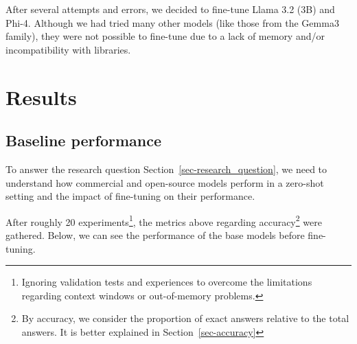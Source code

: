 \documentclass[
  12pt,
]{article}
\begin{document}
After several attempts and errors, we decided to fine-tune Llama 3.2
(3B) and Phi-4. Although we had tried many other models (like those from
the Gemma3 family), they were not possible to fine-tune due to a lack of
memory and/or incompatibility with libraries.

\section{Results}\label{sec-results}

\subsection{Baseline performance}\label{baseline-performance}

To answer the research question Section~\ref{sec-research_question}, we
need to understand how commercial and open-source models perform in a
zero-shot setting and the impact of fine-tuning on their performance.

After roughly 20 experiments\footnote{Ignoring validation tests and
  experiences to overcome the limitations regarding context windows or
  out-of-memory problems.}, the metrics above regarding
accuracy\footnote{By accuracy, we consider the proportion of exact
  answers relative to the total answers. It is better explained in
  Section~\ref{sec-accuracy}} were gathered. Below, we can see the
performance of the base models before fine-tuning.
\end{document}
